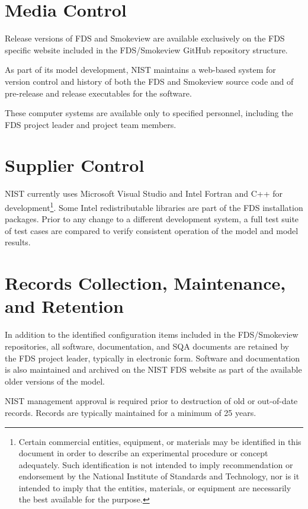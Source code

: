 \documentclass[11pt]{book}
\begin{document}
\section{Media Control}

Release versions of FDS and Smokeview are available exclusively on the FDS specific website included in the FDS/Smokeview GitHub repository structure.

As part of its model development, NIST maintains a web-based system for version control and history of both the FDS and Smokeview source code and of pre-release and release executables for the software.

These computer systems are available only to specified personnel, including the FDS project leader and project team members.

\section{Supplier Control}

NIST currently uses Microsoft Visual Studio and Intel Fortran and C++ for development\footnote{Certain commercial entities, equipment, or materials may be identified in this document in order to describe an experimental procedure or concept adequately. Such identification is not intended to imply recommendation or endorsement by the National Institute of Standards and Technology, nor is it intended to imply that the entities, materials, or equipment are necessarily the best available for the purpose.}. Some Intel redistributable libraries are part of the FDS installation packages.  Prior to any change to a different development system, a full test suite of test cases are compared to verify consistent operation of the model and model results.

\section{Records Collection, Maintenance, and Retention}

In addition to the identified configuration items included in the FDS/Smokeview repositories, all software, documentation, and SQA documents are retained by the FDS project leader, typically in electronic form. Software and documentation is also maintained and archived on the NIST FDS website as part of the available older versions of the model.

NIST management approval is required prior to destruction of old or out-of-date records. Records are typically maintained for a minimum of 25 years.
\end{document}
